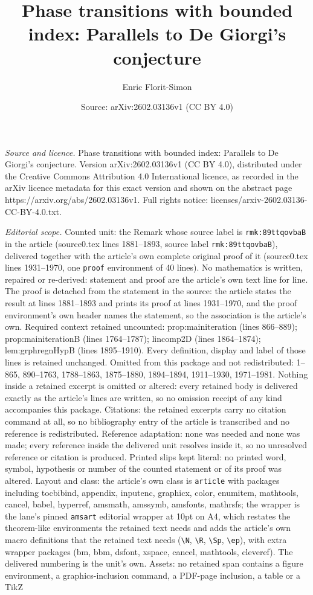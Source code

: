 \documentclass[10pt,a4paper]{amsart}
\title[Phase transitions with bounded index: Parallels to De Giorgi]{Phase transitions with bounded index: Parallels to De Giorgi's conjecture}
\author{Enric Florit-Simon}
\date{Source: arXiv:2602.03136v1 (CC BY 4.0)}
\begin{document}
\maketitle

\noindent\emph{Source and licence.} Phase transitions with bounded index: Parallels to De Giorgi's conjecture. Version arXiv:2602.03136v1 (CC BY 4.0), distributed under the Creative Commons Attribution 4.0 International licence, as recorded in the arXiv licence metadata for this exact version and shown on the abstract page https://arxiv.org/abs/2602.03136v1. Full rights notice: licenses/arxiv-2602.03136-CC-BY-4.0.txt.\par\smallskip

\noindent\textit{Editorial scope.} Counted unit: the Remark whose source label is \texttt{rmk:89ttqovbaB} in the article (source0.tex lines 1881--1893, source label \texttt{rmk:89ttqovbaB}), delivered together with the article's own complete original proof of it (source0.tex lines 1931--1970, one \texttt{proof} environment of 40 lines). No mathematics is written, repaired or re-derived: statement and proof are the article's own text line for line. The proof is detached from the statement in the source: the article states the result at lines 1881--1893 and prints its proof at lines 1931--1970, and the proof environment's own header names the statement, so the association is the article's own. Required context retained uncounted: prop:mainiteration (lines 866--889); prop:mainiterationB (lines 1764--1787); lincomp2D (lines 1864--1874); lem:grphregnHypB (lines 1895--1910). Every definition, display and label of those lines is retained unchanged. Omitted from this package and not redistributed: 1--865, 890--1763, 1788--1863, 1875--1880, 1894--1894, 1911--1930, 1971--1981. Nothing inside a retained excerpt is omitted or altered: every retained body is delivered exactly as the article's lines are written, so no omission receipt of any kind accompanies this package. Citations: the retained excerpts carry no citation command at all, so no bibliography entry of the article is transcribed and no reference is redistributed. Reference adaptation: none was needed and none was made; every reference inside the delivered unit resolves inside it, so no unresolved reference or citation is produced. Printed slips kept literal: no printed word, symbol, hypothesis or number of the counted statement or of its proof was altered. Layout and class: the article's own class is \texttt{article} with packages including tocbibind, appendix, inputenc, graphicx, color, enumitem, mathtools, cancel, babel, hyperref, amsmath, amssymb, amsfonts, mathrsfs; the wrapper is the lane's pinned \texttt{amsart} editorial wrapper at 10pt on A4, which restates the theorem-like environments the retained text needs and adds the article's own macro definitions that the retained text needs (\texttt{\textbackslash N}, \texttt{\textbackslash R}, \texttt{\textbackslash Sp}, \texttt{\textbackslash ep}), with extra wrapper packages (bm, bbm, dsfont, xspace, cancel, mathtools, cleveref). The delivered numbering is the unit's own. Assets: no retained span contains a figure environment, a graphics-inclusion command, a PDF-page inclusion, a table or a TikZ 
\end{document}
